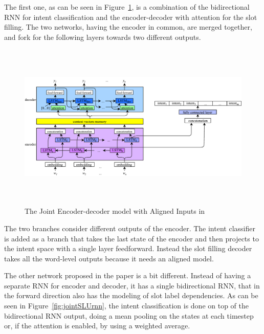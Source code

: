 The first one, as can be seen in Figure~\ref{fig:jointSLUAligned}, is a combination of the bidirectional RNN for intent classification and the encoder-decoder with attention for the slot filling. The two networks, having the encoder in common, are merged together, and fork for the following layers towards two different outputs.

\begin{figure}[!htb]
    \centering
    \includegraphics[max width=0.9\linewidth,max height=8cm,keepaspectratio]{figures/jointSLUAligned}
    \caption{The Joint Encoder-decoder model with Aligned Inputs in~\cite{liu2016attention}}\label{fig:jointSLUAligned}
\end{figure} 

The two branches consider different outputs of the encoder. The intent classifier is added as a branch that takes the last state of the encoder and then projects to the intent space with a single layer feedforward. Instead the slot filling decoder takes all the word-level outputs because it needs an aligned model.

The other network proposed in the paper is a bit different. Instead of having a separate RNN for encoder and decoder, it has a single bidirectional RNN, that in the forward direction also has the modeling of slot label dependencies. As can be seen in Figure~\ref{fig:jointSLUrnn}, the intent classification is done on top of the bidirectional RNN output, doing a mean pooling on the states at each timestep or, if the attention is enabled, by using a weighted average.

